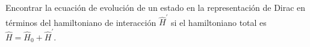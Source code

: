 Encontrar la ecuación de evolución de un estado en la representación de Dirac en términos del hamiltoniano de interacción $\hat{H}^{\prime}$ si el hamiltoniano total es $\hat{H} = \hat{H}_0 + \hat{H}^{\prime}$.

\begin{solution}\ \\

\end{solution}